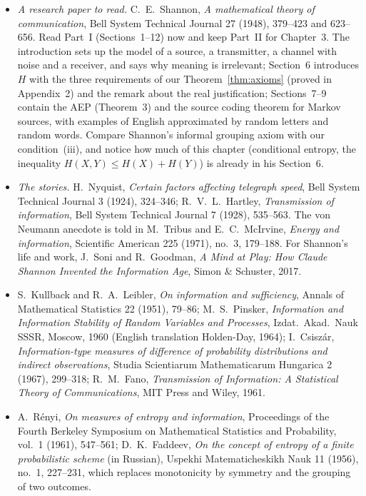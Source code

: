 \begin{itemize}
\item \emph{A research paper to read.} C.~E.~Shannon, \emph{A mathematical theory of communication}, Bell System Technical Journal 27 (1948), 379--423 and 623--656. Read Part~I (Sections~1--12) now and keep Part~II for Chapter~3. The introduction sets up the model of a source, a transmitter, a channel with noise and a receiver, and says why meaning is irrelevant; Section~6 introduces $H$ with the three requirements of our Theorem~\ref{thm:axioms} (proved in Appendix~2) and the remark about the real justification; Sections~7--9 contain the AEP (Theorem~3) and the source coding theorem for Markov sources, with examples of English approximated by random letters and random words. Compare Shannon's informal grouping axiom with our condition~(iii), and notice how much of this chapter (conditional entropy, the inequality $H(X,Y)\le H(X)+H(Y)$) is already in his Section~6.
\item \emph{The stories.} H.~Nyquist, \emph{Certain factors affecting telegraph speed}, Bell System Technical Journal 3 (1924), 324--346; R.~V.~L.~Hartley, \emph{Transmission of information}, Bell System Technical Journal 7 (1928), 535--563. The von Neumann anecdote is told in M.~Tribus and E.~C.~McIrvine, \emph{Energy and information}, Scientific American 225 (1971), no.~3, 179--188. For Shannon's life and work, J.~Soni and R.~Goodman, \emph{A Mind at Play: How Claude Shannon Invented the Information Age}, Simon \& Schuster, 2017.
\item S.~Kullback and R.~A.~Leibler, \emph{On information and sufficiency}, Annals of Mathematical Statistics 22 (1951), 79--86; M.~S.~Pinsker, \emph{Information and Information Stability of Random Variables and Processes}, Izdat.\ Akad.\ Nauk SSSR, Moscow, 1960 (English translation Holden-Day, 1964); I.~Csisz\'ar, \emph{Information-type measures of difference of probability distributions and indirect observations}, Studia Scientiarum Mathematicarum Hungarica 2 (1967), 299--318; R.~M.~Fano, \emph{Transmission of Information: A Statistical Theory of Communications}, MIT Press and Wiley, 1961.
\item A.~R\'enyi, \emph{On measures of entropy and information}, Proceedings of the Fourth Berkeley Symposium on Mathematical Statistics and Probability, vol.~1 (1961), 547--561; D.~K.~Faddeev, \emph{On the concept of entropy of a finite probabilistic scheme} (in Russian), Uspekhi Matematicheskikh Nauk 11 (1956), no.~1, 227--231, which replaces monotonicity by symmetry and the grouping of two outcomes.

\end{itemize}

